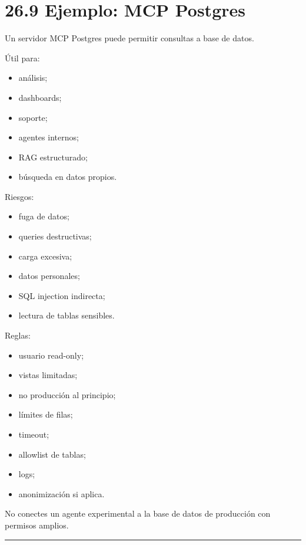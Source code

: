 \section{26.9 Ejemplo: MCP Postgres}\label{ejemplo-mcp-postgres}

Un servidor MCP Postgres puede permitir consultas a base de datos.

Útil para:

\begin{itemize}
\tightlist
\item
  análisis;
\item
  dashboards;
\item
  soporte;
\item
  agentes internos;
\item
  RAG estructurado;
\item
  búsqueda en datos propios.
\end{itemize}

Riesgos:

\begin{itemize}
\tightlist
\item
  fuga de datos;
\item
  queries destructivas;
\item
  carga excesiva;
\item
  datos personales;
\item
  SQL injection indirecta;
\item
  lectura de tablas sensibles.
\end{itemize}

Reglas:

\begin{itemize}
\tightlist
\item
  usuario read-only;
\item
  vistas limitadas;
\item
  no producción al principio;
\item
  límites de filas;
\item
  timeout;
\item
  allowlist de tablas;
\item
  logs;
\item
  anonimización si aplica.
\end{itemize}

No conectes un agente experimental a la base de datos de producción con
permisos amplios.

\begin{center}\rule{0.5\linewidth}{0.5pt}\end{center}


